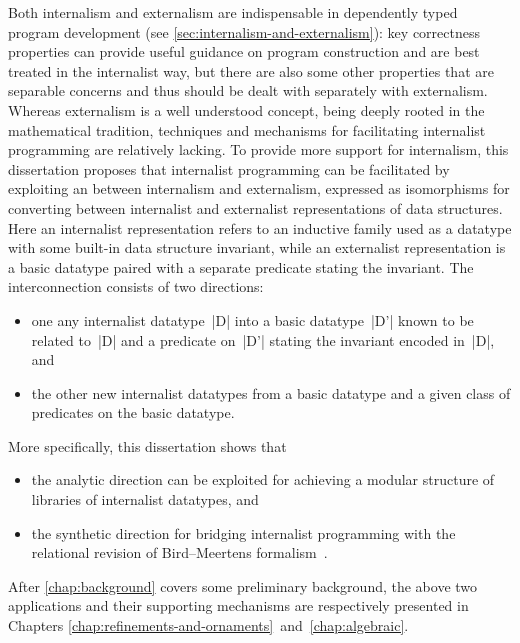 Both internalism and externalism are indispensable in dependently typed program development (see \autoref{sec:internalism-and-externalism}): key correctness properties can provide useful guidance on program construction and are best treated in the internalist way, but there are also some other properties that are separable concerns and thus should be dealt with separately with externalism.
Whereas externalism is a well understood concept, being deeply rooted in the mathematical tradition, techniques and mechanisms for facilitating internalist programming are relatively lacking.
To provide more support for internalism, this dissertation proposes that internalist programming can be facilitated by exploiting an  between internalism and externalism, expressed as isomorphisms for converting between internalist and externalist representations of data structures.
Here an internalist representation refers to an inductive family used as a datatype with some built-in data structure invariant, while an externalist representation is a basic datatype paired with a separate predicate stating the invariant.
The interconnection consists of two directions:
\begin{itemize}
\item one  any internalist datatype~|D| into a basic datatype~|D'| known to be related to~|D| and a predicate on~|D'| stating the invariant encoded in~|D|, and
\item the other  new internalist datatypes from a basic datatype and a given class of predicates on the basic datatype.
\end{itemize}
More specifically, this dissertation shows that
\begin{itemize}
\item the analytic direction can be exploited for achieving a modular structure of libraries of internalist datatypes, and
\item the synthetic direction for bridging internalist programming with the relational revision of Bird--Meertens formalism~\citep{Bird-AoP}.
\end{itemize}
After \autoref{chap:background} covers some preliminary background, the above two applications and their supporting mechanisms are respectively presented in Chapters \ref{chap:refinements-and-ornaments}~and~\ref{chap:algebraic}.
